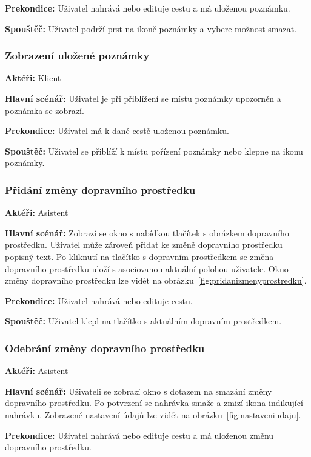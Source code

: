 \documentclass[czech,master,public,dept460,male,java,cpdeclaration]{diploma}
\newcommand{\usecase}[2]{\subsubsection{#1}\label{#2}}
\begin{document}
\vspace{0.1cm}
\noindent
\textbf{Prekondice:} Uživatel nahrává nebo edituje cestu a má uloženou poznámku.

\vspace{0.1cm}
\noindent
\textbf{Spouštěč:} Uživatel podrží prst na ikoně poznámky a vybere možnost smazat.

\usecase{Zobrazení uložené poznámky}{zobrazenipoznamky}
\textbf{Aktéři:} Klient

\vspace{0.1cm}
\noindent
\textbf{Hlavní scénář:} Uživatel je při přiblížení se místu poznámky upozorněn a poznámka se zobrazí.

\vspace{0.1cm}
\noindent
\textbf{Prekondice:} Uživatel má k dané cestě uloženou poznámku.

\vspace{0.1cm}
\noindent
\textbf{Spouštěč:} Uživatel se přiblíží k místu pořízení poznámky nebo klepne na ikonu poznámky.

\usecase{Přidání změny dopravního prostředku}{pridanizmenyprostredku}
\textbf{Aktéři:} Asistent

\vspace{0.1cm}
\noindent
\textbf{Hlavní scénář:} Zobrazí se okno s nabídkou tlačítek s obrázkem dopravního prostředku.
Uživatel může zároveň přidat ke změně dopravního prostředku popisný text. Po kliknutí na
tlačítko s dopravním prostředkem se změna dopravního prostředku uloží s asociovanou aktuální polohou
uživatele. Okno změny dopravního prostředku lze vidět na obrázku~\ref{fig:pridanizmenyprostredku}.

\vspace{0.1cm}
\noindent
\textbf{Prekondice:} Uživatel nahrává nebo edituje cestu.

\vspace{0.1cm}
\noindent
\textbf{Spouštěč:} Uživatel klepl na tlačítko s aktuálním dopravním prostředkem.

\usecase{Odebrání změny dopravního prostředku}{odebranizmenyprostredku}
\textbf{Aktéři:} Asistent

\vspace{0.1cm}
\noindent
\textbf{Hlavní scénář:} Uživateli se zobrazí okno s dotazem na smazání změny dopravního prostředku.
Po potvrzení se nahrávka smaže a zmizí ikona indikující nahrávku. Zobrazené nastavení údajů
lze vidět na obrázku~\ref{fig:nastaveniudaju}.

\vspace{0.1cm}
\noindent
\textbf{Prekondice:} Uživatel nahrává nebo edituje cestu a má uloženou změnu dopravního prostředku.
\end{document}
